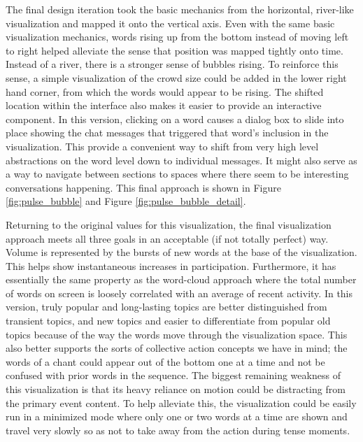 The final design iteration took the basic mechanics from the horizontal, river-like visualization and mapped it onto the vertical axis. Even with the same basic visualization mechanics, words rising up from the bottom instead of moving left to right helped alleviate the sense that position was mapped tightly onto time. Instead of a river, there is a stronger sense of bubbles rising. To reinforce this sense, a simple visualization of the crowd size could be added in the lower right hand corner, from which the words would appear to be rising. The shifted location within the interface also makes it easier to provide an interactive component. In this version, clicking on a word causes a dialog box to slide into place showing the chat messages that triggered that word's inclusion in the visualization. This provide a convenient way to shift from very high level abstractions on the word level down to individual messages. It might also serve as a way to navigate between sections to spaces where there seem to be interesting conversations happening. This final approach is shown in Figure \ref{fig:pulse_bubble} and Figure \ref{fig:pulse_bubble_detail}.



Returning to the original values for this visualization, the final visualization approach meets all three goals in an acceptable (if not totally perfect) way. Volume is represented by the bursts of new words at the base of the visualization. This helps show instantaneous increases in participation. Furthermore, it has essentially the same property as the word-cloud approach where the total number of words on screen is loosely correlated with an average of recent activity. In this version, truly popular and long-lasting topics are better distinguished from transient topics, and new topics and easier to differentiate from popular old topics because of the way the words move through the visualization space. This also better supports the sorts of collective action concepts we have in mind; the words of a chant could appear out of the bottom one at a time and not be confused with prior words in the sequence. The biggest remaining weakness of this visualization is that its heavy reliance on motion could be distracting from the primary event content. To help alleviate this, the visualization could be easily run in a minimized mode where only one or two words at a time are shown and travel very slowly so as not to take away from the action during tense moments.

